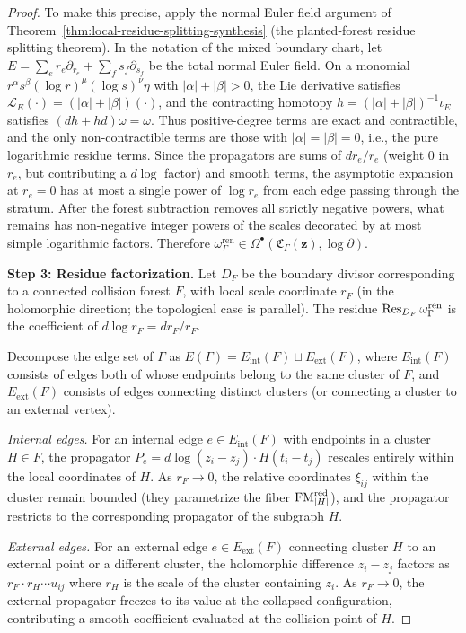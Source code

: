 \begin{proof}
To make this precise, apply the normal Euler field argument of Theorem~\ref{thm:local-residue-splitting-synthesis} (the planted-forest residue splitting theorem). In the notation of the mixed boundary chart, let $E = \sum_e r_e \partial_{r_e} + \sum_f s_f \partial_{s_f}$ be the total normal Euler field. On a monomial $r^\alpha s^\beta (\log r)^\mu (\log s)^\nu \eta$ with $|\alpha| + |\beta| > 0$, the Lie derivative satisfies $\mathcal{L}_E(\cdot) = (|\alpha| + |\beta|)(\cdot)$, and the contracting homotopy $h = (|\alpha|+|\beta|)^{-1}\iota_E$ satisfies $(dh + hd)\omega = \omega$. Thus positive-degree terms are exact and contractible, and the only non-contractible terms are those with $|\alpha| = |\beta| = 0$, i.e., the pure logarithmic residue terms. Since the propagators are sums of $dr_e/r_e$ (weight $0$ in $r_e$, but contributing a $d\log$ factor) and smooth terms, the asymptotic expansion at $r_e = 0$ has at most a single power of $\log r_e$ from each edge passing through the stratum. After the forest subtraction removes all strictly negative powers, what remains has non-negative integer powers of the scales decorated by at most simple logarithmic factors. Therefore $\omega_\Gamma^{\mathrm{ren}} \in \Omega^\bullet(\mathfrak C_\Gamma(\mathbf z), \log \partial)$.

\medskip
\textbf{Step 3: Residue factorization.}
Let $D_F$ be the boundary divisor corresponding to a connected collision forest $F$, with local scale coordinate $r_F$ (in the holomorphic direction; the topological case is parallel). The residue $\mathrm{Res}_{D_F}\,\omega_\Gamma^{\mathrm{ren}}$ is the coefficient of $d\log r_F = dr_F/r_F$.

Decompose the edge set of $\Gamma$ as $E(\Gamma) = E_{\mathrm{int}}(F) \sqcup E_{\mathrm{ext}}(F)$, where $E_{\mathrm{int}}(F)$ consists of edges both of whose endpoints belong to the same cluster of $F$, and $E_{\mathrm{ext}}(F)$ consists of edges connecting distinct clusters (or connecting a cluster to an external vertex).

\emph{Internal edges.} For an internal edge $e \in E_{\mathrm{int}}(F)$ with endpoints in a cluster $H \in F$, the propagator $P_e = d\log(z_i - z_j) \cdot H(t_i - t_j)$ rescales entirely within the local coordinates of $H$. As $r_F \to 0$, the relative coordinates $\xi_{ij}$ within the cluster remain bounded (they parametrize the fiber $\mathrm{FM}_{|H|}^{\mathrm{red}}$), and the propagator restricts to the corresponding propagator of the subgraph $H$.

\emph{External edges.} For an external edge $e \in E_{\mathrm{ext}}(F)$ connecting cluster $H$ to an external point or a different cluster, the holomorphic difference $z_i - z_j$ factors as $r_F \cdot r_H \cdots u_{ij}$ where $r_H$ is the scale of the cluster containing $z_i$. As $r_F \to 0$, the external propagator freezes to its value at the collapsed configuration, contributing a smooth coefficient evaluated at the collision point of $H$.


\end{proof}
